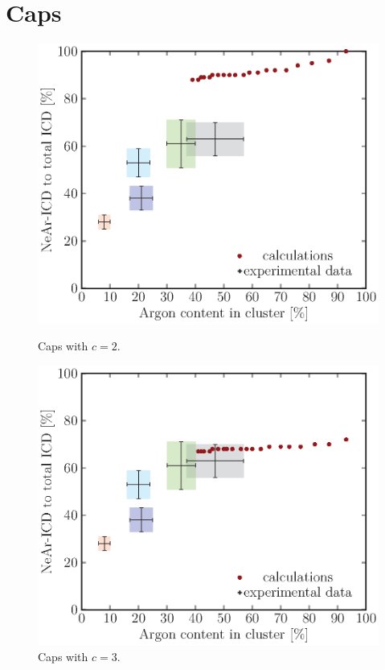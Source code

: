 \section{Caps}
\begin{figure}[!H]
\begin{minipage}{0.48\textwidth}
    \centering
    \includegraphics[scale=0.5]{pics/caps02.ps}
    \caption{Caps with $c=2$.}
    \label{caps02}
\end{minipage}
\hfill
\begin{minipage}{0.48\textwidth}
    \centering
    \includegraphics[scale=0.5]{pics/caps03.ps}
    \caption{Caps with $c=3$.}
    \label{caps03}
\end{minipage}
\end{figure}


